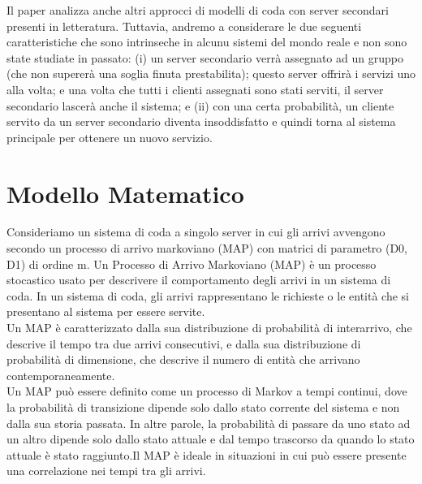 \documentclass[11pt]{article}
\begin{document}
\noindent Il paper analizza anche altri approcci di modelli di coda con server secondari presenti in letteratura. Tuttavia, andremo a considerare le due seguenti caratteristiche che sono intrinseche in alcunu sistemi del mondo reale e non sono state studiate in passato: (i) un server secondario verrà assegnato ad un gruppo (che non supererà una soglia finuta prestabilita); questo server offrirà i servizi uno alla volta; e una volta che tutti i clienti assegnati sono stati serviti, il server secondario lascerà anche il sistema; e (ii) con una certa probabilità, un cliente servito da un server secondario diventa insoddisfatto e quindi torna al sistema principale per ottenere un nuovo servizio.

\clearpage

\section{Modello Matematico}


Consideriamo un sistema di coda a singolo server in cui gli arrivi avvengono secondo un processo di arrivo markoviano (MAP) con matrici di parametro (D0, D1) di ordine m. Un Processo di Arrivo Markoviano (MAP) è un processo stocastico usato per descrivere il comportamento degli arrivi in un sistema di coda. In un sistema di coda, gli arrivi rappresentano le richieste o le entità che si presentano al sistema per essere servite. \\

\noindent Un MAP è caratterizzato dalla sua distribuzione di probabilità di interarrivo, che descrive il tempo tra due arrivi consecutivi, e dalla sua distribuzione di probabilità di dimensione, che descrive il numero di entità che arrivano contemporaneamente. \\

\noindent Un MAP può essere definito come un processo di Markov a tempi continui, dove la probabilità di transizione dipende solo dallo stato corrente del sistema e non dalla sua storia passata. In altre parole, la probabilità di passare da uno stato ad un altro dipende solo dallo stato attuale e dal tempo trascorso da quando lo stato attuale è stato raggiunto.Il MAP è ideale in situazioni in cui può essere presente una correlazione nei tempi tra gli arrivi.
\end{document}
